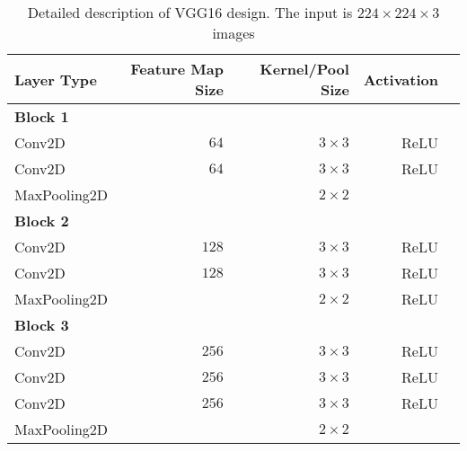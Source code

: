 \begin{table}[H]
	\centering
	\caption{Detailed description of VGG16 design. The input is $224 \times 224 \times3$ images}
	\label{tab:vgg16}
	\begin{tabular}{lrrrr}
		\textbf{Layer Type}     & \textbf{Feature Map Size} & \textbf{Kernel/Pool Size} & \textbf{Activation}  \\ \hline
		\textbf{Block 1}        &                           &                           &                                     \\
		\rowcolor{lightGrey}  
		Conv2D                  & $64$                      & $3\times3$                & ReLU                                \\
		Conv2D                  & $64$                      & $3\times3$                & ReLU                                \\
		\rowcolor{lightGrey} 
		MaxPooling2D            &                           & $2\times2$                &                                     \\
		\textbf{Block 2}        &                           &                           &                                     \\
		\rowcolor{lightGrey}  
		Conv2D                  & $128$                     & $3\times3$                & ReLU                                \\
		Conv2D                  & $128$                     & $3\times3$                & ReLU                                \\
		\rowcolor{lightGrey}  
		MaxPooling2D            &                       &    $2\times2$             & ReLU                                \\
		\textbf{Block 3}        &                           &                           &                                    \\
		\rowcolor{lightGrey}  
		Conv2D                  & $256$                     & $3\times3$                & ReLU                                \\
		Conv2D                  & $256$                     & $3\times3$                & ReLU                                \\
		\rowcolor[HTML]{EFEFEF} 
		Conv2D                  & $256$                     & $3\times3$                & ReLU                                \\
		MaxPooling2D            &               &          $2\times2$                  &                                     \\

\end{tabular}
\end{table}
